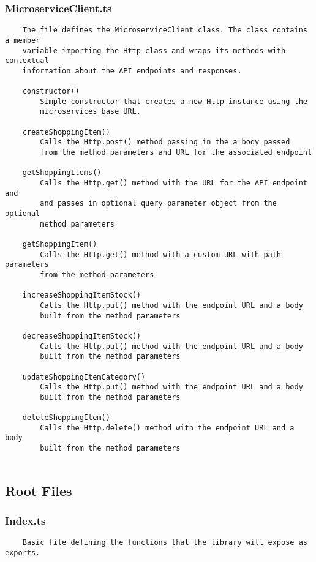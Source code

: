 \subsubsection{MicroserviceClient.ts}
\begin{verbatim}
    The file defines the MicroserviceClient class. The class contains a member
    variable importing the Http class and wraps its methods with contextual
    information about the API endpoints and responses. 
    
    constructor()
        Simple constructor that creates a new Http instance using the 
        microservices base URL.
    
    createShoppingItem()
        Calls the Http.post() method passing in the a body passed
        from the method parameters and URL for the associated endpoint
        
    getShoppingItems()
        Calls the Http.get() method with the URL for the API endpoint and
        and passes in optional query parameter object from the optional
        method parameters
    
    getShoppingItem()
        Calls the Http.get() method with a custom URL with path parameters
        from the method parameters
    
    increaseShoppingItemStock()
        Calls the Http.put() method with the endpoint URL and a body
        built from the method parameters
    
    decreaseShoppingItemStock()
        Calls the Http.put() method with the endpoint URL and a body
        built from the method parameters
    
    updateShoppingItemCategory()
        Calls the Http.put() method with the endpoint URL and a body
        built from the method parameters
        
    deleteShoppingItem()
        Calls the Http.delete() method with the endpoint URL and a body
        built from the method parameters
        
\end{verbatim}
\subsection{Root Files}
\subsubsection{Index.ts}
\begin{verbatim}
    Basic file defining the functions that the library will expose as exports.
\end{verbatim}
